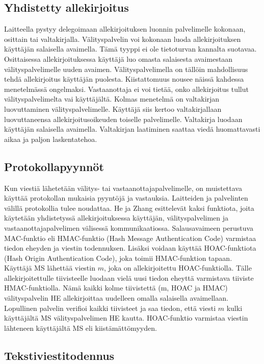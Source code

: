 \documentclass[finnish]{tktltiki2}
\theoremstyle{definition}
\theoremstyle{remark}
\begin{document}
\subsection{Yhdistetty allekirjoitus}

Laitteella pystyy delegoimaan allekirjoituksen luonnin palvelimelle kokonaan, osittain tai valtakirjalla. Välityspalvelin voi kokonaan luoda allekirjoituksen käyttäjän salaisella avaimella. Tämä tyyppi ei ole tietoturvan kannalta suotavaa. Osittaisessa allekirjoituksessa käyttäjä luo omasta salaisesta avaimestaan välityspalvelimelle uuden avaimen. Välityspalvelimella on tällöin mahdollisuus tehdä allekirjoitus käyttäjän puolesta. Kiistattomuus nousee näissä kahdessa menetelmässä ongelmaksi. Vastaanottaja ei voi tietää, onko allekirjoitus tullut välityspalvelimelta vai käyttäjältä. Kolmas menetelmä on valtakirjan luovuttaminen välityspalvelimelle. Käyttäjä siis kertoo valtakirjallaan luovuttaneensa allekirjoitusoikeuden toiselle palvelimelle. Valtakirja luodaan käyttäjän salaisella avaimella. Valtakirjan laatiminen saattaa viedä huomattavasti aikaa ja paljon laskentatehoa. \cite{joint}

\subsection{Protokollapyynnöt}

Kun viestiä lähetetään välitys- tai vastaanottajapalvelimelle, on muistettava käyttää protokollan mukaisia pyyntöjä ja vastauksia. Laitteiden ja palvelinten välillä protokollia tulee noudattaa. He ja Zhang \cite{joint} esittelevät kaksi funktiota, joita käytetään yhdistetyssä allekirjoituksessa käyttäjän, välityspalvelimen ja vastaanottajapalvelimen välisessä kommunikaatiossa. Salausavaimeen perustuva MAC-funktio eli HMAC-funktio (Hash Message Authentication Code) varmistaa tiedon eheyden ja viestin todennuksen. Lisäksi voidaan käyttää HOAC-funktiota (Hash Origin Authentication Code), joka toimii HMAC-funktion tapaan. Käyttäjä MS lähettää viestin $m$, joka on allekirjoitettu HOAC-funktiolla. Tälle allekirjoitettulle tiivisteelle luodaan vielä uusi tiedon eheyttä varmistava tiiviste HMAC-funktiolla. Nämä kaikki kolme tiivistettä (m, HOAC ja HMAC) välityspalvelin HE allekirjoittaa uudelleen omalla salaisella avaimellaan. Lopullinen palvelin verifioi kaikki tiivisteet ja saa tiedon, että viesti $m$ kulki käyttäjältä MS välityspalvelimen HE kautta. HOAC-funktio varmistaa viestin lähteneen käyttäjältä MS eli kiistämättömyyden.

\subsection{Tekstiviestitodennus}
\end{document}
